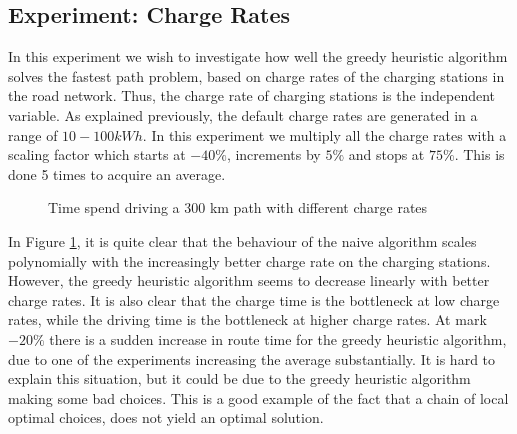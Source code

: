 \subsection{Experiment: Charge Rates}

In this experiment we wish to investigate how well the greedy heuristic algorithm solves the fastest path problem, based on charge rates of the charging stations in the road network. Thus, the charge rate of charging stations is the independent variable. As explained previously, the default charge rates are generated in a range of $10-100 \si{kWh}$. In this experiment we multiply all the charge rates with a scaling factor which starts at $-40\%$, increments by $5\%$ and stops at $75\%$. This is done 5 times to acquire an average. 

\begin{figure}[!htb]
\centering
{}
\caption{Time spend driving a 300 km path with different charge rates} 
\label{fig:charge_rate}
\end{figure}

In Figure \ref{fig:charge_rate}, it is quite clear that the behaviour of the naive algorithm scales polynomially with the increasingly better charge rate on the charging stations. However, the greedy heuristic algorithm seems to decrease linearly with better charge rates. It is also clear that the charge time is the bottleneck at low charge rates, while the driving time is the bottleneck at higher charge rates. At mark $-20\%$ there is a sudden increase in route time for the greedy heuristic algorithm, due to one of the experiments increasing the average substantially. It is hard to explain this situation, but it could be due to the greedy heuristic algorithm making some bad choices. This is a good example of the fact that a chain of local optimal choices, does not yield an optimal solution.